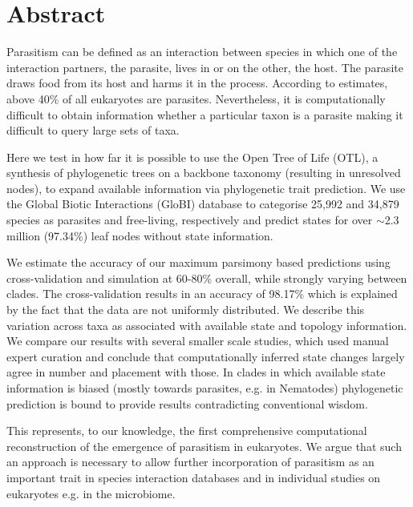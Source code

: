 \chapter*{Abstract}

  Parasitism can be defined as an interaction between species in which one of the interaction 
    partners, the parasite, lives in or on the other, the host. The parasite draws food from its 
    host and harms it in the process. According to estimates, above 40\% of all eukaryotes are 
    parasites. Nevertheless, it is computationally difficult to obtain information whether a 
    particular taxon is a parasite making it difficult to query large sets of taxa.

  Here we test in how far it is possible to use the Open Tree of Life (OTL), a synthesis of 
    phylogenetic trees on a backbone taxonomy (resulting in unresolved nodes), to expand available 
    information via phylogenetic trait prediction. We use the Global Biotic Interactions (GloBI) 
    database to categorise 25,992 and 34,879 species as parasites and free-living, respectively and 
    predict states for over $\sim$2.3 million (97.34\%) leaf nodes without state information.

  We estimate the accuracy of our maximum parsimony based predictions using cross-validation and 
    simulation at 60-80\% overall, while strongly varying between clades. The cross-validation 
    results in an accuracy of 98.17\% which is explained by the fact that the data are not uniformly 
    distributed. We describe this variation across taxa as associated with available state and 
    topology information. We compare our results with several smaller scale studies, which used 
    manual expert curation and conclude that computationally inferred state changes largely agree in 
    number and placement with those. In clades in which available state information is biased 
    (mostly towards parasites, e.g. in Nematodes) phylogenetic prediction is bound to provide 
    results contradicting conventional wisdom.

  This represents, to our knowledge, the first comprehensive computational reconstruction of the 
    emergence of parasitism in eukaryotes. We argue that such an approach is necessary to allow 
    further incorporation of parasitism as an important trait in species interaction databases and 
    in individual studies on eukaryotes e.g. in the microbiome.


